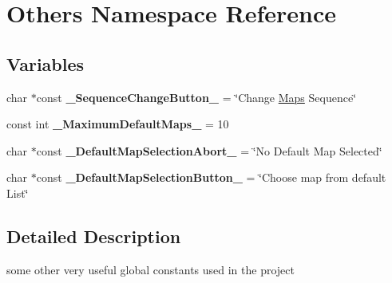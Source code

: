 \hypertarget{namespace_others}{}\section{Others Namespace Reference}
\label{namespace_others}
\subsection*{Variables}
\begin{DoxyCompactItemize}
\item 
\hypertarget{namespace_others_a13a46b573cb2ab6dba2106e7691f5fe9}{}\label{namespace_others_a13a46b573cb2ab6dba2106e7691f5fe9} 
char $\ast$const {\bfseries \+\_\+\+Sequence\+Change\+Button\+\_\+} = \char`\"{}Change \hyperlink{class_maps}{Maps} Sequence\char`\"{}
\item 
\hypertarget{namespace_others_a7df5da03ef9837ad3b9f1a52a04ae339}{}\label{namespace_others_a7df5da03ef9837ad3b9f1a52a04ae339} 
const int {\bfseries \+\_\+\+Maximum\+Default\+Maps\+\_\+} = 10
\item 
\hypertarget{namespace_others_a7da177096d27f1a267215b4a2e13e583}{}\label{namespace_others_a7da177096d27f1a267215b4a2e13e583} 
char $\ast$const {\bfseries \+\_\+\+Default\+Map\+Selection\+Abort\+\_\+} = \char`\"{}No Default Map Selected\char`\"{}
\item 
\hypertarget{namespace_others_aba3dcf2e0855b3955b1a778adbcc1b8e}{}\label{namespace_others_aba3dcf2e0855b3955b1a778adbcc1b8e} 
char $\ast$const {\bfseries \+\_\+\+Default\+Map\+Selection\+Button\+\_\+} = \char`\"{}Choose map from default List\char`\"{}
\end{DoxyCompactItemize}


\subsection{Detailed Description}
some other very useful global constants used in the project 